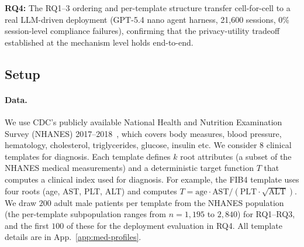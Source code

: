 \textbf{RQ4:} The RQ1--3 ordering and per-template structure transfer cell-for-cell to a real LLM-driven deployment (GPT-5.4 nano agent harness, 21{,}600 sessions, 0\% session-level compliance failures), confirming that the privacy-utility tradeoff established at the mechanism level holds end-to-end.
 
 
 
 


\subsection{Setup}
\label{sec:exp-setup}
\paragraph{Data.} We use CDC's publicly available National Health and Nutrition
Examination Survey (NHANES) 2017--2018~\cite{nhanes2017exam}, which covers   body measures, blood pressure, hematology, cholesterol, triglycerides, glucose, insulin etc. We consider $8$ clinical templates for diagnosis. Each template defines $k$ root attributes (a subset of the NHANES medical measurements) and a deterministic target function $T$ that computes a clinical index used for diagnosis. For example, the FIB4 template uses four roots (age, AST, PLT, ALT) and computes $T = \text{age} \cdot \text{AST} / (\text{PLT} \cdot \sqrt{\text{ALT}})$. We draw $200$ adult male patients per template from the NHANES population (the per-template subpopulation ranges from $n = 1{,}195$ to $2{,}840$) for RQ1--RQ3, and the first $100$ of these for the deployment evaluation in RQ4. All template details are in App.~\ref{app:med-profiles}.

